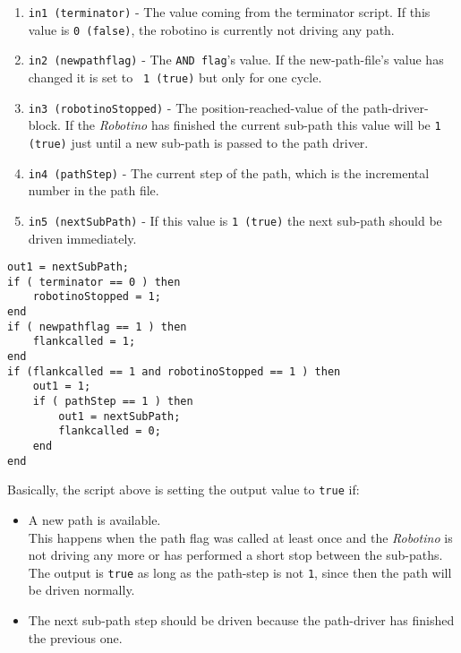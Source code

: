 \begin{enumerate}[topsep=0pt,itemsep=0ex,partopsep=10ex,parsep=1ex]
  \item \texttt{in1 (terminator)} - The value coming from the terminator script. If this value is \texttt{0 (false)}, the robotino is currently not driving any path.
  \item \texttt{in2 (newpathflag)} - The \texttt{AND flag}'s value. If the new-path-file's value has changed it is set to \texttt{ 1 (true)} but only for one cycle.
  \item \texttt{in3 (robotinoStopped)} - The position-reached-value of the path-driver-block. If the \textit{Robotino} has finished the current sub-path this value will be \texttt{1 (true)} just until a new sub-path is passed to the path driver.
  \item \texttt{in4 (pathStep)} - The current step of the path, which is the incremental number in the path file.
  \item \texttt{in5 (nextSubPath)} - If this value is \texttt{1 (true)} the next sub-path should be driven immediately.
\end{enumerate}
%
%
\newpage
\begin{lstlisting}[caption = Lua Script, label = leftluascript]
out1 = nextSubPath;
if ( terminator == 0 ) then
	robotinoStopped = 1;
end
if ( newpathflag == 1 ) then
	flankcalled = 1;
end
if (flankcalled == 1 and robotinoStopped == 1 ) then
	out1 = 1;
	if ( pathStep == 1 ) then 
		out1 = nextSubPath;
		flankcalled = 0;
	end
end
\end{lstlisting}
Basically, the script above is setting the output value to \texttt{true} if:
\begin{itemize}[noitemsep]
\item A new path is available. \\
This happens when the path flag was called at least once and the \textit{Robotino} is not driving any more or has performed a short stop between the sub-paths.
The output is \texttt{true} as long as the path-step is not \texttt{1}, since then the path will be driven normally.
\item The next sub-path step should be driven because the path-driver has finished the previous one.
\end{itemize}
